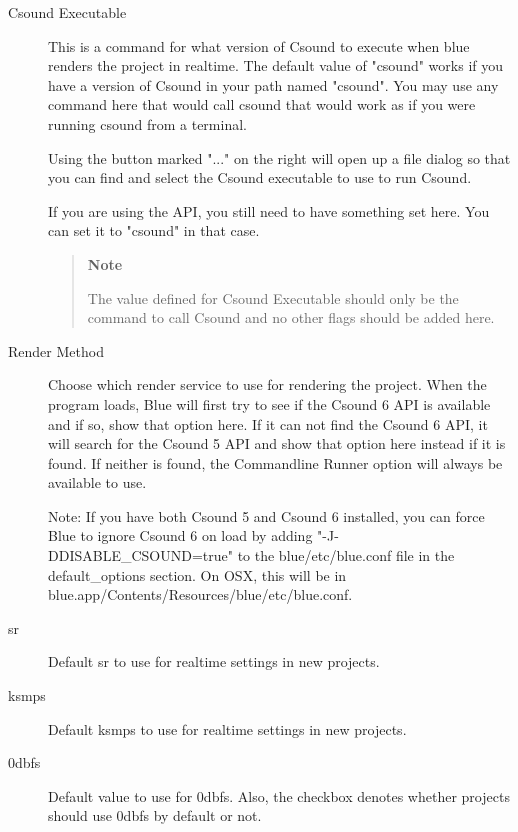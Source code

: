 \begin{description}
\item[Csound Executable]
This is a command for what version of Csound to execute when blue
renders the project in realtime. The default value of "csound" works if
you have a version of Csound in your path named "csound". You may use
any command here that would call csound that would work as if you were
running csound from a terminal.

Using the button marked "..." on the right will open up a file dialog so
that you can find and select the Csound executable to use to run Csound.

If you are using the API, you still need to have something set here. You
can set it to "csound" in that case.

\begin{quote}
\textbf{Note}

The value defined for Csound Executable should only be the command to
call Csound and no other flags should be added here.
\end{quote}
\item[Render Method]
Choose which render service to use for rendering the project. When the
program loads, Blue will first try to see if the Csound 6 API is
available and if so, show that option here. If it can not find the
Csound 6 API, it will search for the Csound 5 API and show that option
here instead if it is found. If neither is found, the Commandline Runner
option will always be available to use.

Note: If you have both Csound 5 and Csound 6 installed, you can force
Blue to ignore Csound 6 on load by adding "-J-DDISABLE\_CSOUND=true" to
the blue/etc/blue.conf file in the default\_options section. On OSX,
this will be in blue.app/Contents/Resources/blue/etc/blue.conf.
\item[sr]
Default sr to use for realtime settings in new projects.
\item[ksmps]
Default ksmps to use for realtime settings in new projects.
\item[0dbfs]
Default value to use for 0dbfs. Also, the checkbox denotes whether
projects should use 0dbfs by default or not.
\end{description}

